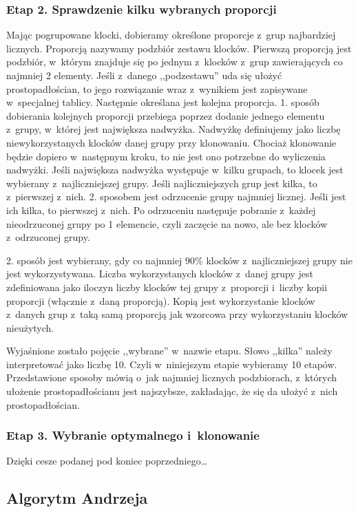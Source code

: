 \documentclass[12pt]{article}
\begin{document}
\subsubsection{Etap 2. Sprawdzenie kilku wybranych proporcji}
Mając pogrupowane klocki, dobieramy określone proporcje z~grup
najbardziej licznych. Proporcją nazywamy podzbiór zestawu klocków.
Pierwszą proporcją jest podzbiór, w~którym znajduje się po jednym
z~klocków z~grup zawierających co najmniej 2 elementy. Jeśli z~danego
,,podzestawu'' uda się ułożyć prostopadłościan, to jego rozwiązanie
wraz z~wynikiem jest zapisywane w~specjalnej tablicy. Następnie określana
jest kolejna proporcja. 1. sposób dobierania kolejnych proporcji przebiega
poprzez dodanie jednego elementu z~grupy, w~której jest największa
nadwyżka. Nadwyżkę definiujemy jako liczbę niewykorzystanych klocków danej
grupy przy klonowaniu. Chociaż klonowanie będzie dopiero w~następnym
kroku, to nie jest ono potrzebne do wyliczenia nadwyżki. Jeśli największa
nadwyżka występuje w~kilku grupach, to klocek jest wybierany
z~najliczniejszej grupy. Jeśli najliczniejszych grup jest kilka, to
z~pierwszej z~nich. 2. sposobem jest odrzucenie grupy najmniej licznej.
Jeśli jest ich kilka, to pierwszej z~nich. Po odrzuceniu następuje pobranie
z~każdej nieodrzuconej grupy po 1 elemencie, czyli zaczęcie na nowo, ale
bez klocków z~odrzuconej grupy.

2. sposób jest wybierany, gdy co najmniej
$90\%$ klocków z~najliczniejszej grupy nie jest wykorzystywana.
Liczba wykorzystanych klocków z~danej grupy jest zdefiniowana jako iloczyn
liczby klocków tej grupy z~proporcji i~liczby kopii proporcji (włącznie
z~daną proporcją). Kopią jest wykorzystanie klocków z~danych grup z~taką
samą proporcją jak wzorcowa przy wykorzystaniu klocków nieużytych. 

Wyjaśnione zostało pojęcie ,,wybrane'' w~nazwie etapu. Słowo ,,kilka''
należy interpretować jako liczbę 10. Czyli w~niniejszym etapie wybieramy
10 etapów. Przedstawione sposoby mówią o~jak najmniej licznych podzbiorach,
z~których ułożenie prostopadłościanu jest najszybsze, zakładając, że się
da ułożyć z~nich prostopadłościan.

\subsubsection{Etap 3. Wybranie optymalnego i~klonowanie}
Dzięki cesze podanej pod koniec poprzedniego\ldots

\subsection{Algorytm Andrzeja}
\end{document}
